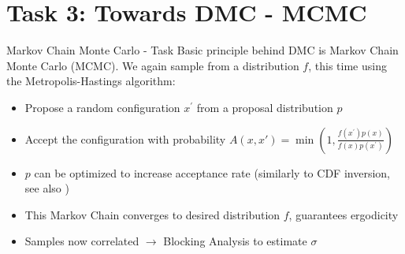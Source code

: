 \documentclass[10pt,xcolor=table, aspectratio=1610]{beamer}
\begin{document}
\section{Task 3: Towards DMC - MCMC}

\begin{frame}[containsverbatim]{Markov Chain Monte Carlo - Task}
Basic principle behind DMC is Markov Chain Monte Carlo (MCMC). We again sample from
a distribution $f$, this time using the \alert{Metropolis-Hastings algorithm}:
\begin{itemize}
  \item Propose a random configuration $x^\prime$ from a proposal distribution $p$
  \item Accept the configuration with probability $A(x, x')=\min \left(1, \frac{f(x^{\prime}) p\left(x\right)}{f\left(x\right) p\left(x^{\prime}\right)}\right)$
  \item $p$ can be optimized to increase acceptance rate (similarly to CDF inversion, see also \cite[Chapter 12.3.1.1]{fehske})
  \item This \alert{Markov Chain} converges to desired distribution $f$, guarantees ergodicity
  \item Samples now \alert{correlated} $\rightarrow$ \alert{Blocking Analysis} to estimate $\sigma$
\end{itemize}
\end{frame}

\end{document}
